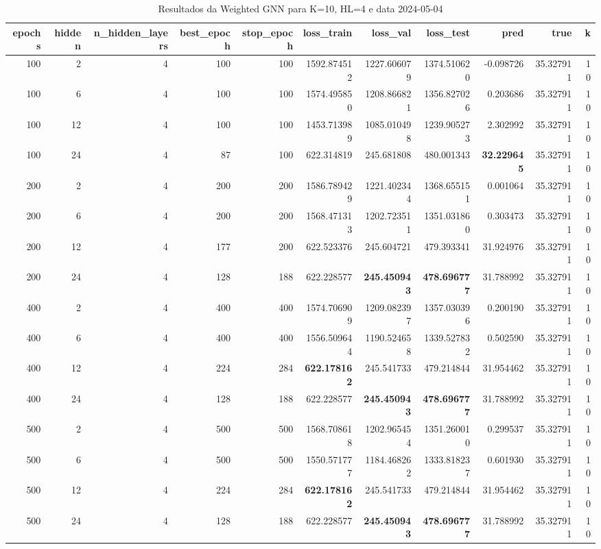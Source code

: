 \begin{table}
\caption{Resultados da Weighted GNN para K=10, HL=4 e data 2024-05-04}
\label{tab:weighted_gnn_results_k10_hl4_d20240504}
\begin{tabular}{rrrrrrrrrrr}
\toprule
epochs & hidden & n\_hidden\_layers & best\_epoch & stop\_epoch & loss\_train & loss\_val & loss\_test & pred & true & k \\
\midrule
100 & 2 & 4 & 100 & 100 & 1592.874512 & 1227.606079 & 1374.510620 & -0.098726 & 35.327911 & 10 \\
100 & 6 & 4 & 100 & 100 & 1574.495850 & 1208.866821 & 1356.827026 & 0.203686 & 35.327911 & 10 \\
100 & 12 & 4 & 100 & 100 & 1453.713989 & 1085.010498 & 1239.905273 & 2.302992 & 35.327911 & 10 \\
100 & 24 & 4 & 87 & 100 & 622.314819 & 245.681808 & 480.001343 & \textbf{32.229645} & 35.327911 & 10 \\
200 & 2 & 4 & 200 & 200 & 1586.789429 & 1221.402344 & 1368.655151 & 0.001064 & 35.327911 & 10 \\
200 & 6 & 4 & 200 & 200 & 1568.471313 & 1202.723511 & 1351.031860 & 0.303473 & 35.327911 & 10 \\
200 & 12 & 4 & 177 & 200 & 622.523376 & 245.604721 & 479.393341 & 31.924976 & 35.327911 & 10 \\
200 & 24 & 4 & 128 & 188 & 622.228577 & \textbf{245.450943} & \textbf{478.696777} & 31.788992 & 35.327911 & 10 \\
400 & 2 & 4 & 400 & 400 & 1574.706909 & 1209.082397 & 1357.030396 & 0.200190 & 35.327911 & 10 \\
400 & 6 & 4 & 400 & 400 & 1556.509644 & 1190.524658 & 1339.527832 & 0.502590 & 35.327911 & 10 \\
400 & 12 & 4 & 224 & 284 & \textbf{622.178162} & 245.541733 & 479.214844 & 31.954462 & 35.327911 & 10 \\
400 & 24 & 4 & 128 & 188 & 622.228577 & \textbf{245.450943} & \textbf{478.696777} & 31.788992 & 35.327911 & 10 \\
500 & 2 & 4 & 500 & 500 & 1568.708618 & 1202.965454 & 1351.260010 & 0.299537 & 35.327911 & 10 \\
500 & 6 & 4 & 500 & 500 & 1550.571777 & 1184.468262 & 1333.818237 & 0.601930 & 35.327911 & 10 \\
500 & 12 & 4 & 224 & 284 & \textbf{622.178162} & 245.541733 & 479.214844 & 31.954462 & 35.327911 & 10 \\
500 & 24 & 4 & 128 & 188 & 622.228577 & \textbf{245.450943} & \textbf{478.696777} & 31.788992 & 35.327911 & 10 \\

\end{tabular}
\end{table}

